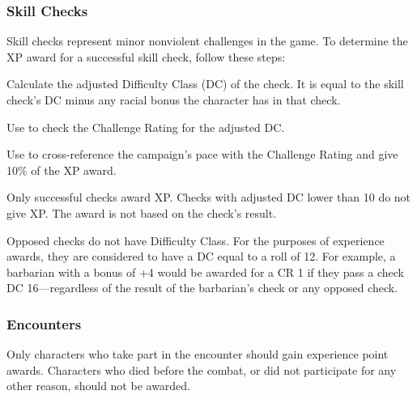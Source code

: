 \subsubsection{Skill Checks}
Skill checks represent minor nonviolent challenges in the game. To determine the XP award for a successful skill check, follow these steps:

\begin{enumerate*}
	\item Calculate the adjusted Difficulty Class (DC) of the check. It is equal to the skill check's DC minus any racial bonus the character has in that check.
	\item Use  to check the Challenge Rating for the adjusted DC.
	\item Use  to cross-reference the campaign's pace with the Challenge Rating and give 10\% of the XP award.
\end{enumerate*}

Only successful checks award XP. Checks with adjusted DC lower than 10 do not give XP. The award is not based on the check's result.

Opposed checks do not have Difficulty Class. For the purposes of experience awards, they are considered to have a DC equal to a roll of 12. For example, a barbarian with a  bonus of +4 would be awarded for a CR 1 if they pass a  check DC 16---regardless of the result of the barbarian's  check or any opposed  check.



\subsubsection{Encounters}
Only characters who take part in the encounter should gain experience point awards. Characters who died before the combat, or did not participate for any other reason, should not be awarded.

